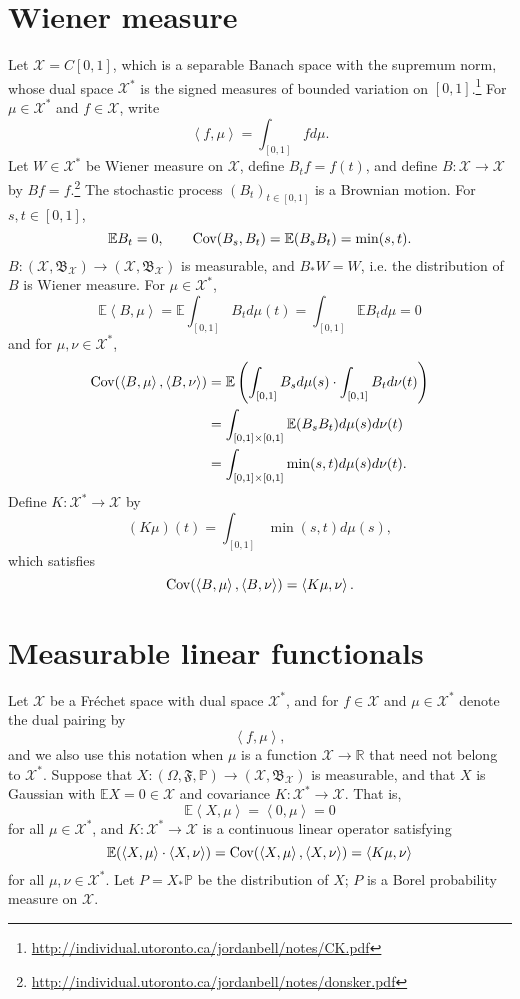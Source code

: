 \documentclass{article}
\newcommand{\inner}[2]{\left\langle #1, #2 \right\rangle}
\newcommand{\Cov}{\ensuremath\mathrm{Cov}}
\theoremstyle{definition}
\begin{document}
\section{Wiener measure}
\label{wiener}
Let $\mathscr{X}=C[0,1]$, which is a separable Banach space with the supremum norm, whose
dual space $\mathscr{X}^*$ is the signed measures of bounded variation on $[0,1]$.\footnote{\url{http://individual.utoronto.ca/jordanbell/notes/CK.pdf}}
For $\mu \in \mathscr{X}^*$ and $f \in \mathscr{X}$, write
\[
\inner{f}{\mu} = \int_{[0,1]} f d\mu.
\]
Let $W \in \mathscr{X}^*$ be Wiener measure on $\mathscr{X}$,  define 
$B_tf = f(t)$, and define
$B:\mathscr{X} \to \mathscr{X}$ by
$Bf = f$.\footnote{\url{http://individual.utoronto.ca/jordanbell/notes/donsker.pdf}}
The stochastic process $(B_t)_{t \in [0,1]}$ is  a Brownian motion. For $s,t \in [0,1]$,
\[
\mathbb{E} B_t = 0,\qquad \Cov(B_s,B_t)=\mathbb{E}(B_s B_t) = \min(s,t).
\]
$B:(\mathscr{X},\mathfrak{B}_{\mathscr{X}}) \to (\mathscr{X},\mathfrak{B}_{\mathscr{X}})$ is measurable, and
$B_* W = W$, i.e. the distribution of $B$ is Wiener measure.
For $\mu \in \mathscr{X}^*$,
\[
\mathbb{E} \inner{B}{\mu} = \mathbb{E} \int_{[0,1]} B_t d\mu(t) = \int_{[0,1]} \mathbb{E}B_t d\mu = 0
\]
and for $\mu,\nu \in \mathscr{X}^*$,
\begin{align*}
\Cov(\inner{B}{\mu},\inner{B}{\nu})&=\mathbb{E}\left(\int_{[0,1]} B_s d\mu(s) \cdot \int_{[0,1]} B_t d\nu(t) \right)\\
&=\int_{[0,1] \times [0,1]} \mathbb{E}(B_s B_t) d\mu(s) d\nu(t)\\
&=\int_{[0,1] \times [0,1]} \min(s,t) d\mu(s) d\nu(t).
\end{align*}
Define $K:\mathscr{X}^* \to \mathscr{X}$ by
\[
(K\mu)(t) = \int_{[0,1]} \min(s,t) d\mu(s),
\]
which satisfies
\[
\Cov(\inner{B}{\mu},\inner{B}{\nu}) = \inner{K\mu}{\nu}.
\]




\section{Measurable linear functionals}
Let $\mathscr{X}$ be a Fr\'echet space with dual space $\mathscr{X}^*$, and for $f \in \mathscr{X}$ and $\mu
\in \mathscr{X}^*$ denote the dual pairing by
\[
\inner{f}{\mu},
\]
and we also use this notation when $\mu$ is a function  $\mathscr{X} \to \mathbb{R}$ that need not belong to $\mathscr{X}^*$.
Suppose that $X:(\Omega,\mathfrak{F},\mathbb{P}) \to (\mathscr{X},\mathfrak{B}_{\mathscr{X}})$ is measurable,
and that
$X$ is Gaussian with $\mathbb{E} X=0 \in \mathscr{X}$ and covariance $K:\mathscr{X}^* \to \mathscr{X}$. That is, 
\[
\mathbb{E} \inner{X}{\mu} = \inner{0}{\mu}=0
\]
for all $\mu \in \mathscr{X}^*$, and $K:\mathscr{X}^* \to \mathscr{X}$ is a continuous linear operator satisfying
\[
\mathbb{E}(\inner{X}{\mu} \cdot \inner{X}{\nu}) = \Cov(\inner{X}{\mu},\inner{X}{\nu}) = \inner{K\mu}{\nu}
\]
for all $\mu,\nu \in \mathscr{X}^*$. 
Let $P=X_* \mathbb{P}$ be the distribution of $X$; $P$ is a Borel probability measure on $\mathscr{X}$.
\end{document}
